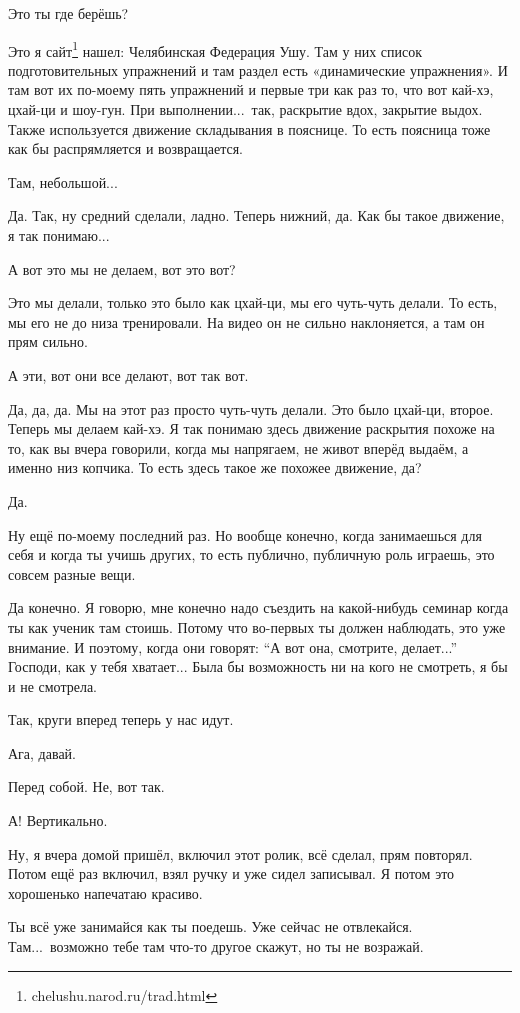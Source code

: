 \M
Это ты где берёшь?

\I
Это я сайт\footnote*{\tentt chelushu.narod.ru/trad.html} нашел: Челябинская Федерация Ушу.
Там у них список подготовительных упражнений и там
раздел есть «динамические упражнения». И
там вот их по-моему пять упражнений и первые три как раз то, что вот кай-хэ, цхай-ци и шоу-гун.
При выполнении...\ так, раскрытие вдох, закрытие выдох.
Также используется движение складывания в пояснице.
То есть поясница тоже как бы распрямляется и возвращается.

\M
Там, небольшой...

\I
Да. Так, ну средний сделали, ладно. Теперь нижний, да. Как
бы такое движение, я так понимаю...

\M
А вот это мы не делаем, вот это вот?

\I
Это мы делали, только это было как цхай-ци, мы его
чуть-чуть делали. То есть, мы его не до
низа тренировали.
На видео он не сильно наклоняется, а там он прям сильно.

\M
А эти, вот они все делают, вот так вот.

\I
Да, да, да.
Мы на этот раз просто чуть-чуть делали.
Это было цхай-ци, второе.
Теперь мы делаем кай-хэ.
Я так понимаю здесь движение раскрытия похоже на то, как вы вчера говорили,
когда мы напрягаем, не живот вперёд выдаём, а именно низ копчика.
То есть здесь такое же похожее движение, да?

\M
Да.

\I
Ну ещё по-моему последний раз.
Но вообще
конечно, когда занимаешься для себя и когда ты учишь других, то есть публично, публичную роль
играешь, это совсем разные вещи.

\M
Да конечно.
Я говорю, мне конечно надо съездить на какой-нибудь семинар когда ты как ученик там стоишь.
Потому что во-первых ты должен наблюдать, это уже внимание.
И поэтому, когда они говорят: ``А вот она,
смотрите, делает...'' Господи, как у тебя хватает... Была бы возможность ни на кого не смотреть,
я бы и не смотрела.

\I
Так, круги вперед теперь у нас идут.

\M
Ага, давай.

\I
Перед собой. Не, вот так.

\M
А! Вертикально.

\I
Ну, я вчера домой пришёл, включил этот ролик, всё сделал, прям повторял.
Потом ещё раз включил, взял ручку и уже сидел записывал. Я потом это хорошенько напечатаю красиво.

\M
Ты всё уже занимайся как ты поедешь.
Уже сейчас не отвлекайся. Там...\ возможно тебе там что-то другое скажут, но ты не возражай.

